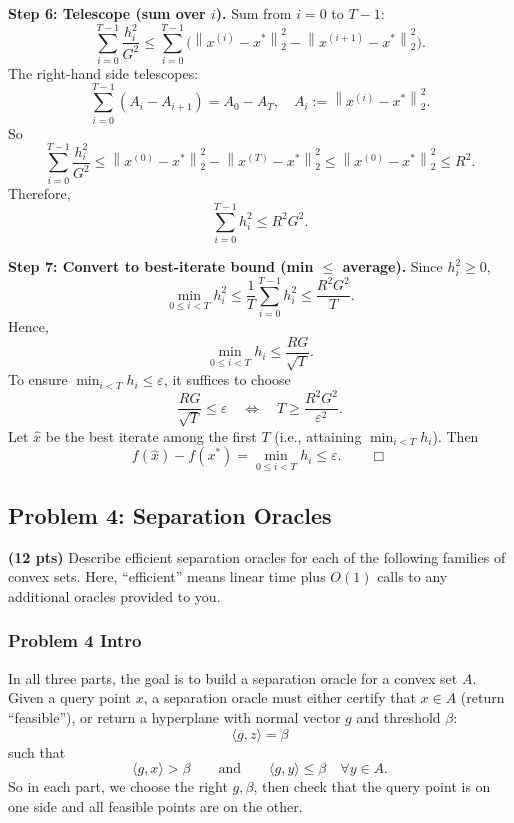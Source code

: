 \documentclass[10pt]{article}
\newcommand{\norm}[1]{\left\lVert #1\right\rVert}
\begin{document}
\medskip
\textbf{Step 6: Telescope (sum over $i$).}
Sum from $i=0$ to $T-1$:
\[
\sum_{i=0}^{T-1}\frac{h_i^2}{G^2}
\le
\sum_{i=0}^{T-1}\Big(\norm{x^{(i)}-x^*}_2^2 - \norm{x^{(i+1)}-x^*}_2^2\Big).
\]
The right-hand side telescopes:
\[
\sum_{i=0}^{T-1}(A_i-A_{i+1})=A_0-A_T,
\quad
A_i:=\norm{x^{(i)}-x^*}_2^2.
\]
So
\[
\sum_{i=0}^{T-1}\frac{h_i^2}{G^2}
\le
\norm{x^{(0)}-x^*}_2^2 - \norm{x^{(T)}-x^*}_2^2
\le
\norm{x^{(0)}-x^*}_2^2
\le
R^2.
\]
Therefore,
\[
\boxed{
\sum_{i=0}^{T-1} h_i^2 \le R^2G^2.
}
\]

\medskip
\textbf{Step 7: Convert to best-iterate bound (min $\le$ average).}
Since $h_i^2\ge 0$,
\[
\min_{0\le i<T} h_i^2
\le
\frac{1}{T}\sum_{i=0}^{T-1}h_i^2
\le
\frac{R^2G^2}{T}.
\]
Hence,
\[
\boxed{
\min_{0\le i<T} h_i \le \frac{RG}{\sqrt{T}}.
}
\]
To ensure $\min_{i<T} h_i \le \varepsilon$, it suffices to choose
\[
\frac{RG}{\sqrt{T}} \le \varepsilon
\quad\Longleftrightarrow\quad
T \ge \frac{R^2G^2}{\varepsilon^2}.
\]
Let $\hat x$ be the best iterate among the first $T$ (i.e., attaining $\min_{i<T} h_i$). Then
\[
f(\hat x)-f(x^*) = \min_{0\le i<T} h_i \le \varepsilon.
\qquad \Box
\]


\subsection{Problem 4: Separation Oracles}
\textbf{(12 pts)} Describe efficient separation oracles for each of the following families of convex sets.  Here, ``efficient'' means linear time plus $O(1)$ calls to any additional oracles provided to you.

\subsubsection*{Problem 4 Intro}
In all three parts, the goal is to build a separation oracle for a convex set $A$. Given a query point $x$, a separation oracle must either certify that $x\in A$ (return ``feasible''), or return a hyperplane with normal vector $g$ and threshold $\beta$:
\[
\langle g,z\rangle = \beta
\]
such that
\[
\langle g,x\rangle > \beta
\qquad\text{and}\qquad
\langle g,y\rangle \le \beta \quad \forall y\in A.
\]
So in each part, we choose the right $g,\beta$, then check that the query point is on one side and all feasible points are on the other.
\end{document}
